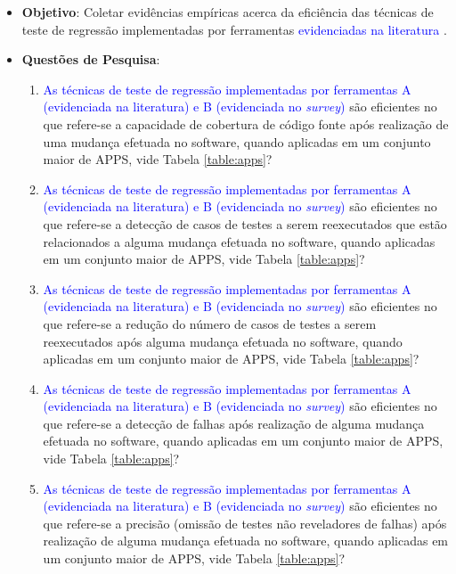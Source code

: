 \begin{itemize}

\item \textbf{Objetivo}:
   Coletar evidências empíricas acerca da eficiência das técnicas de teste de regressão implementadas por ferramentas \textcolor{blue}{evidenciadas na literatura \cite{8453877}}.
   
    \item \textbf{Questões de Pesquisa}:
    
    \begin{enumerate}[label=\bf QP\arabic*,leftmargin=2.1cm]
       
        \item \textcolor{blue}{As técnicas de teste de regressão implementadas por ferramentas A (evidenciada na literatura) e B (evidenciada no \textit{survey})} são eficientes no que refere-se a capacidade de cobertura de código fonte após realização de uma mudança efetuada no software, quando aplicadas em um conjunto maior de \ac{APPS}, vide Tabela \ref{table:apps}?
        
        \item \textcolor{blue}{As técnicas de teste de regressão implementadas por ferramentas A (evidenciada na literatura) e B (evidenciada no \textit{survey})} são eficientes no que refere-se a detecção de casos de testes a serem reexecutados que estão relacionados a alguma mudança efetuada no software, quando aplicadas em um conjunto maior de \ac{APPS}, vide Tabela \ref{table:apps}?
        
        \item \textcolor{blue}{As técnicas de teste de regressão implementadas por ferramentas A (evidenciada na literatura) e B (evidenciada no \textit{survey})} são eficientes no que refere-se a redução do número de casos de testes a serem reexecutados após alguma mudança efetuada no software, quando aplicadas em um conjunto maior de \ac{APPS}, vide Tabela \ref{table:apps}? 
        
        \item \textcolor{blue}{As técnicas de teste de regressão implementadas por ferramentas A (evidenciada na literatura) e B (evidenciada no \textit{survey})} são eficientes no que refere-se a detecção de falhas após realização de alguma mudança efetuada no software, quando aplicadas em um conjunto maior de \ac{APPS}, vide Tabela \ref{table:apps}?
        
        \item \textcolor{blue}{As técnicas de teste de regressão implementadas por ferramentas A (evidenciada na literatura) e B (evidenciada no \textit{survey})} são eficientes no que refere-se a precisão (omissão de testes não reveladores de falhas) após realização de alguma mudança efetuada no software, quando aplicadas em um conjunto maior de \ac{APPS}, vide Tabela \ref{table:apps}?
        

\end{enumerate}
\end{itemize}

